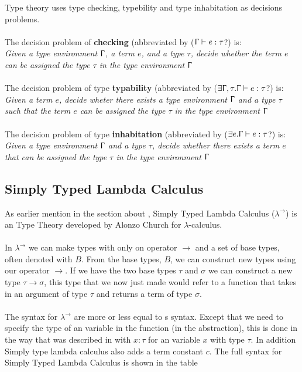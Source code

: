 Type theory uses type checking, typebility and type inhabitation as decisions problems. \\ \\
The decision problem of \textbf{checking} (abbreviated by ($\Upgamma\vdash e : \tau$?) is:\\
\textit{Given a type environment $\Upgamma$, a term $e$, and a type $\tau$, decide whether the term $e$ can be assigned the type $\tau$ in the type environment $\Upgamma$} \\ \\
The decision problem of type \textbf{typability} (abbreviated by ($ \exists \Upgamma,\tau .\Upgamma\vdash e : \tau$?) is: \\ 
\textit{Given  a term $e$, decide wheter there exists a type environment $\Upgamma$ and a type $\tau$ such that the term $e$ can be assigned the type $\tau$ in the type environment $\Upgamma$} \\ \\ 
The decision problem of type \textbf{inhabitation} (abbreviated by ($ \exists e.\Upgamma \vdash e : \tau$?) is: \\
\textit{Given a type environment $\Upgamma$ and a type $\tau$, decide whether there exists a term $e$ that can be assigned the type $\tau$ in the type environment $\Upgamma$}

\subsection{Simply Typed Lambda Calculus}
\label{Simply Typed Lambda Calculus}
As earlier mention in the section about , Simply Typed Lambda Calculus 
($\lambda^\rightarrow$) is an Type Theory developed by Alonzo Church for $\lambda$-calculus. \\ \\
In $\lambda^\rightarrow$ we can make types with only on operator $\rightarrow$ and a set of base types,
 often denoted with $B$. From the base types, $B$, we can construct new types using our operator 
 $\rightarrow$. If we have the two base types $\tau$ and $\sigma$ we can construct a new 
 type $\tau \rightarrow \sigma$, this type that we now just made would refer to a function 
 that takes in an argument of type $\tau$ and returns a term of type $\sigma$. \\ \\
The syntax for $\lambda^\rightarrow$ are more or less equal to s syntax. 
Except that we need to specify the type of an variable in the function (in the abstraction), 
this is done in the way that was described in  with $x:\tau$ for an variable $x$ with 
type $\tau$. In addition Simply type lambda calculus also adds a term constant $c$. The full syntax for 
Simply Typed Lambda Calculus is shown in the table  \\

